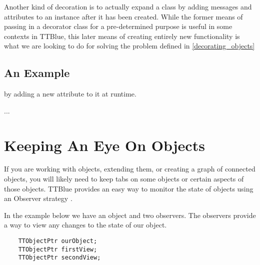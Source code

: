 Another kind of decoration is to actually expand a class by adding messages and attributes to an instance after it has been created.
While the former means of passing in a decorator class for a pre-determined purpose is useful in some contexts in TTBlue, 
this later means of creating entirely new functionality is what we are looking to do for solving the problem defined in \ref{decorating_objects}


\subsection{An Example}


 by adding a new attribute to it at runtime.

...


\section{Keeping An Eye On Objects}

If you are working with objects, extending them, or creating a graph of connected objects, you will likely need to keep tabs on some objects or certain aspects of those objects.  TTBlue provides an easy way to monitor the state of objects using an Observer strategy \cite{gang of four, page?}.





In the example below we have an object and two observers.  
The observers provide a way to view any changes to the state of our object.

\begin{lstlisting}
	TTObjectPtr	ourObject;
	TTObjectPtr	firstView;
	TTObjectPtr	secondView;

	

\end{lstlisting}